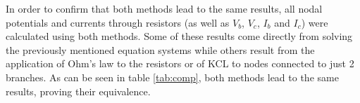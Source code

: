\par


%


In order to confirm that both methods lead to the same results, all nodal potentials and currents through resistors (as well as $V_b$, $V_c$, $I_b$ and $I_c$) were calculated using both methods. Some of these results come directly from solving the previously mentioned equation systems while others result from the application of Ohm's law to the resistors or of KCL to nodes connected to just 2 branches. As can be seen in table \ref{tab:comp}, both methods lead to the same results, proving their equivalence.


